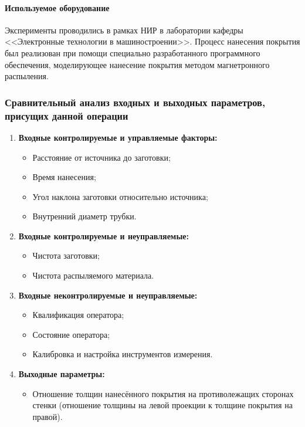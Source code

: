 \documentclass[../../AISTR.tex]{subfiles}
\begin{document}
\paragraph{Используемое оборудование}
Эксперименты проводились в рамках НИР в лаборатории кафедры <<Электронные технологии в машиностроении>>. Процесс нанесения покрытия был реализован при помощи специально разработанного программного обеспечения, моделирующее нанесение покрытия методом магнетронного распыления.
\subsubsection{Сравнительный анализ входных и выходных параметров, присущих данной операции}
\begin{enumerate}
	\item \textbf{Входные контролируемые и управляемые факторы:}
	\begin{itemize}
		\item Расстояние от источника до заготовки;
		\item Время нанесения;
		\item Угол наклона заготовки относительно источника;
		\item Внутренний диаметр трубки.
	\end{itemize}	
	\item \textbf{Входные контролируемые и неуправляемые:}
	\begin{itemize}
		\item Чистота заготовки;
		\item Чистота распыляемого материала.
	\end{itemize}
	\item \textbf{Входные неконтролируемые и неуправляемые:}
	\begin{itemize}
		\item Квалификация оператора;
		\item Состояние оператора;
		\item Калибровка и настройка инструментов измерения.
	\end{itemize}
	\item \textbf{Выходные параметры:}\label{par:y}
	\begin{itemize}
		\item Отношение толщин нанесённого покрытия на противолежащих сторонах стенки (отношение толщины на левой проекции к толщине покрытия на правой).
	\end{itemize}	
\end{enumerate}
\end{document}

